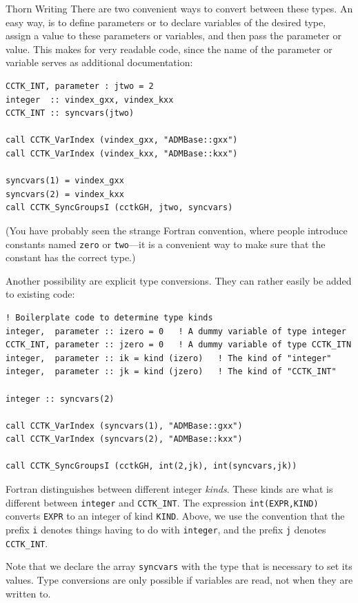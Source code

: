 \begin{cactuspart}{Thorn Writing}
There are two convenient ways to convert between these types.  An easy
way, is to define parameters or to declare variables of the desired
type, assign a value to these parameters or variables, and then pass
the parameter or value.  This makes for very readable code, since the
name of the parameter or variable serves as additional documentation:

\begin{verbatim}
CCTK_INT, parameter : jtwo = 2
integer  :: vindex_gxx, vindex_kxx
CCTK_INT :: syncvars(jtwo)

call CCTK_VarIndex (vindex_gxx, "ADMBase::gxx")
call CCTK_VarIndex (vindex_kxx, "ADMBase::kxx")

syncvars(1) = vindex_gxx
syncvars(2) = vindex_kxx
call CCTK_SyncGroupsI (cctkGH, jtwo, syncvars)
\end{verbatim}

(You have probably seen the strange Fortran convention, where people
introduce constants named \texttt{zero} or \texttt{two}---it is a convenient way to make sure that the
constant has the correct type.)

Another possibility are explicit type conversions.  They can rather
easily be added to existing code:

\begin{verbatim}
! Boilerplate code to determine type kinds
integer,  parameter :: izero = 0   ! A dummy variable of type integer
CCTK_INT, parameter :: jzero = 0   ! A dummy variable of type CCTK_ITN
integer,  parameter :: ik = kind (izero)   ! The kind of "integer"
integer,  parameter :: jk = kind (jzero)   ! The kind of "CCTK_INT"

integer :: syncvars(2)

call CCTK_VarIndex (syncvars(1), "ADMBase::gxx")
call CCTK_VarIndex (syncvars(2), "ADMBase::kxx")

call CCTK_SyncGroupsI (cctkGH, int(2,jk), int(syncvars,jk))
\end{verbatim}

Fortran distinguishes between different integer \emph{kinds}.  These
kinds are what is different between \texttt{integer} and
\texttt{CCTK\_INT}.  The expression \texttt{int(EXPR,KIND)} converts
\texttt{EXPR} to an integer of kind \texttt{KIND}.  Above, we use the
convention that the prefix \texttt{i} denotes things having to do with
\texttt{integer}, and the prefix \texttt{j} denotes
\texttt{CCTK\_INT}.

Note that we declare the array \texttt{syncvars} with the type that is
necessary to set its values.  Type conversions are only possible if
variables are read, not when they are written to.



\end{cactuspart}
